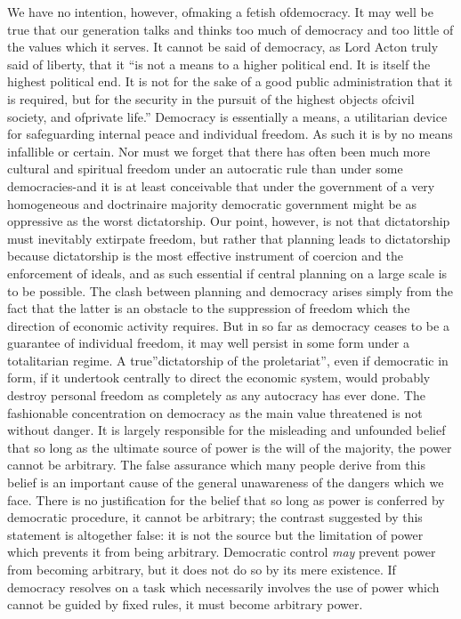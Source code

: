 \documentclass[11pt,openany]{book}
\begin{document}
We have no intention, however, ofmaking a fetish ofdemocracy. It may well be true that our generation talks and thinks too much of democracy and too little of the values which it serves. It cannot be said of democracy, as Lord Acton truly said of liberty, that it ``is not a means to a higher political end. It is itself the highest political end. It is not for the sake of a good public administration that it is required, but for the security in the pursuit of the highest objects ofcivil society, and ofprivate life.'' Democracy is essentially a means, a utilitarian device for safeguarding internal peace and individual freedom. As such it is by no means infallible or certain. Nor must we forget that there has often been much more cultural and spiritual freedom under an autocratic rule than under some democracies-and it is at least conceivable that under the government of a very homogeneous and doctrinaire majority democratic government might be as oppressive as the worst dictatorship. Our point, however, is not that dictatorship must inevitably extirpate freedom, but rather that planning leads to dictatorship because dictatorship is the most effective instrument of coercion and the enforcement of ideals, and as such essential if central planning on a large scale is to be possible. The clash between planning and democracy arises simply from the fact that the latter is an obstacle to the suppression of freedom which the direction of economic activity requires. But in so far as democracy ceases to be a guarantee of individual freedom, it may well persist in some form under a totalitarian regime. A true''dictatorship of the proletariat'', even if democratic in form, if it undertook centrally to direct the economic system, would probably destroy personal freedom as completely as any autocracy has ever done. The fashionable concentration on democracy as the main value threatened is not without danger. It is largely responsible for the misleading and unfounded belief that so long as the ultimate source of power is the will of the majority, the power cannot be arbitrary. The false assurance which many people derive from this belief is an important cause of the general unawareness of the dangers which we face. There is no justification for the belief that so long as power is conferred by democratic procedure, it cannot be arbitrary; the contrast suggested by this statement is altogether false: it is not the source but the limitation of power which prevents it from being arbitrary. Democratic control \emph{may} prevent power from becoming arbitrary, but it does not do so by its mere existence. If democracy resolves on a task which necessarily involves the use of power which cannot be guided by fixed rules, it must become arbitrary power.
\end{document}
